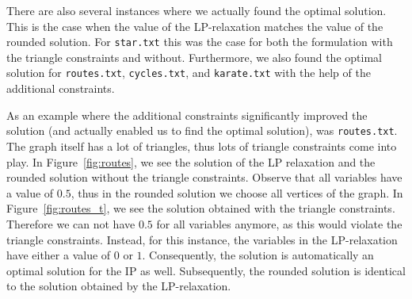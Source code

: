 \documentclass{article}
\begin{document}
There are also several instances where we actually found the optimal solution. This is the case when the value of the LP-relaxation matches the value of the rounded solution. For \lstinline|star.txt| this was the case for both the formulation with the triangle constraints and without. Furthermore, we also found the optimal solution for \lstinline|routes.txt|, \lstinline|cycles.txt|, and \lstinline|karate.txt| with the help of the additional constraints. 

As an example where the additional constraints significantly improved the solution (and actually enabled us to find the optimal solution), was \lstinline|routes.txt|. The graph itself has a lot of triangles, thus lots of triangle constraints come into play. In Figure~\ref{fig:routes}, we see the solution of the LP relaxation and the rounded solution without the triangle constraints. Observe that all variables have a value of $0.5$, thus in the rounded solution we choose all vertices of the graph. In Figure~\ref{fig:routes_t}, we see the solution obtained with the triangle constraints. Therefore we can not have $0.5$ for all variables anymore, as this would violate the triangle constraints. Instead, for this instance, the variables in the LP-relaxation have either a value of $0$ or $1$. Consequently, the solution is automatically an optimal solution for the IP as well. Subsequently, the rounded solution is identical to the solution obtained by the LP-relaxation.
\end{document}
